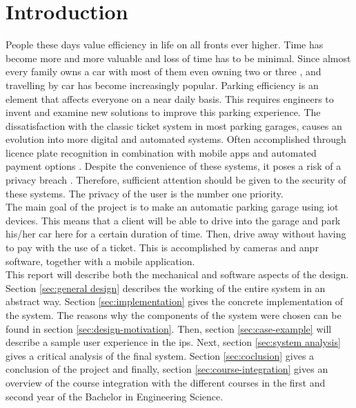\section{Introduction}\label{Introduction}

People these days value efficiency in life on all fronts ever higher. Time has become more and more valuable and loss of time has to be minimal. Since almost every family owns a car with most of them even owning two or three \cite{vehicles_in_families}, and travelling by car has become increasingly popular. Parking efficiency is an element that affects everyone on a near daily basis. This requires engineers to invent and examine new solutions to improve this parking experience. The dissatisfaction with the classic ticket system in most parking garages, causes an evolution into more digital and automated systems. Often accomplished through licence plate recognition in combination with mobile apps and automated payment options \cite{4411}. Despite the convenience of these systems, it poses a risk of a privacy breach \cite{privacy_breach}. Therefore, sufficient attention should be given to the security of these systems. The privacy of the user is the number one priority.\\

The main goal of the project is to make an automatic parking garage using \ac{iot} devices. This means that a client will be able to drive into the garage and park his/her car here for a certain duration of time. Then, drive away without having to pay with the use of a ticket. This is accomplished by cameras and \ac{anpr} software, together with a mobile application. \\

This report will describe both the mechanical and software aspects of the design. Section \ref{sec:general design} describes the working of the entire system in an abstract way. Section \ref{sec:implementation} gives the concrete implementation of the system. The reasons why the components of the system were chosen can be found in section \ref{sec:design-motivation}. Then, section \ref{sec:case-example} will describe a sample user experience in the \ac{ips}. Next, section \ref{sec:system analysis} gives a critical analysis of the final system. Section \ref{sec:coclusion} gives a conclusion of the project and finally, section \ref{sec:course-integration} gives an overview of the course integration with the different courses in the first and second year of the Bachelor in Engineering Science.

